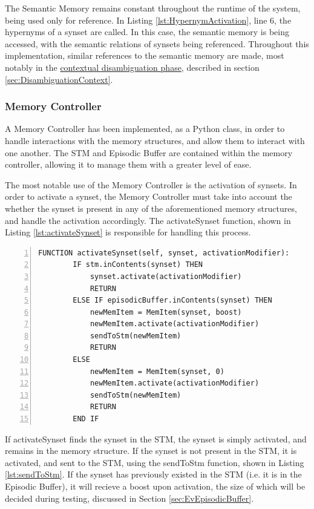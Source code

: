 \documentclass[]{article}
\begin{document}
The Semantic Memory remains constant throughout the runtime of the system, being used only for reference. In Listing \ref{lst:HypernymActivation}, line 6, the hypernyms of a synset are called. In this case, the semantic memory is being accessed, with the semantic relations of synsets being referenced. Throughout this implementation, similar references to the semantic memory are made, most notably in the \hyperref[sec:DisambiguationContext]{contextual disambiguation phase}, described in section \ref{sec:DisambiguationContext}.

\subsubsection{Memory Controller}
\label{sec:ImplementedMemoryController}

A Memory Controller has been implemented, as a Python class, in order to handle interactions with the memory structures, and allow them to interact with one another. The STM and Episodic Buffer are contained within the memory controller, allowing it to manage them with a greater level of ease. 

The most notable use of the Memory Controller is the activation of synsets. In order to activate a synset, the Memory Controller must take into account the whether the synset is present in any of the aforementioned memory structures, and handle the activation accordingly. The activateSynset function, shown in Listing \ref{lst:activateSynset} is responsible for handling this process.

\begin{lstlisting}[numbers=left, numberstyle=\small, caption={the activateSynset function}, captionpos=b, label={lst:activateSynset}]
FUNCTION activateSynset(self, synset, activationModifier):
        IF stm.inContents(synset) THEN
            synset.activate(activationModifier)
            RETURN
        ELSE IF episodicBuffer.inContents(synset) THEN
            newMemItem = MemItem(synset, boost)
            newMemItem.activate(activationModifier)
            sendToStm(newMemItem)
            RETURN
        ELSE
            newMemItem = MemItem(synset, 0)
            newMemItem.activate(activationModifier)
            sendToStm(newMemItem)
            RETURN
        END IF
\end{lstlisting}

If activateSynset finds the synset in the STM, the synset is simply activated, and remains in the memory structure. If the synset is not present in the STM, it is activated, and sent to the STM, using the sendToStm function, shown in Listing \ref{lst:sendToStm}. If the synset has previously existed in the STM (i.e. it is in the Episodic Buffer), it will recieve a boost upon activation, the size of which will be decided during testing, discussed in Section \ref{sec:EvEpisodicBuffer}.
\end{document}

